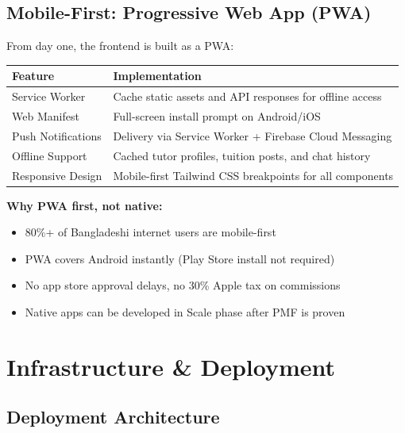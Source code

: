 \documentclass[12pt,a4paper,twoside]{report}
\begin{document}
\section{Mobile-First: Progressive Web App (PWA)}

From day one, the frontend is built as a PWA:

\begin{longtable}{p{3cm}|p{10cm}}
\toprule
\textbf{Feature} & \textbf{Implementation} \\
\midrule
\endhead
\bottomrule
\endfoot
Service Worker & Cache static assets and API responses for offline access \\
Web Manifest & Full-screen install prompt on Android/iOS \\
Push Notifications & Delivery via Service Worker + Firebase Cloud Messaging \\
Offline Support & Cached tutor profiles, tuition posts, and chat history \\
Responsive Design & Mobile-first Tailwind CSS breakpoints for all components \\
\bottomrule
\end{longtable}

\textbf{Why PWA first, not native:}
\begin{itemize}
    \item 80\%+ of Bangladeshi internet users are mobile-first
    \item PWA covers Android instantly (Play Store install not required)
    \item No app store approval delays, no 30\% Apple tax on commissions
    \item Native apps can be developed in Scale phase after PMF is proven
\end{itemize}

\chapter{Infrastructure \& Deployment}

\section{Deployment Architecture}
\end{document}
